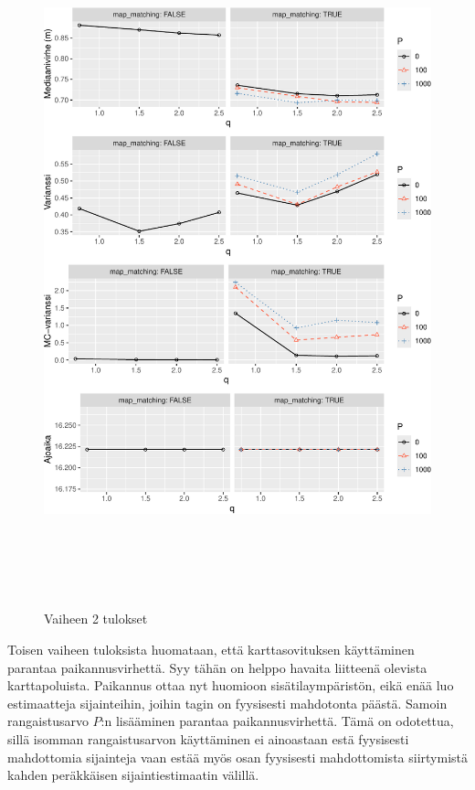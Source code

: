 \documentclass[
  12pt,
  a4paper, twoside]{book}
\begin{document}
\begin{figure}

{\centering \includegraphics[width=15cm,height=20cm]{output/figures/phase2-results-1} 

}

\caption{Vaiheen 2 tulokset}\label{fig:phase2-results}
\end{figure}

Toisen vaiheen tuloksista huomataan, että karttasovituksen käyttäminen parantaa paikannusvirhettä. Syy tähän on helppo havaita liitteenä olevista karttapoluista. Paikannus ottaa nyt huomioon sisätilaympäristön, eikä enää luo estimaatteja sijainteihin, joihin tagin on fyysisesti mahdotonta päästä. Samoin rangaistusarvo \(P\):n lisääminen parantaa paikannusvirhettä. Tämä on odotettua, sillä isomman rangaistusarvon käyttäminen ei ainoastaan estä fyysisesti mahdottomia sijainteja vaan estää myös osan fyysisesti mahdottomista siirtymistä kahden peräkkäisen sijaintiestimaatin välillä.
\end{document}
